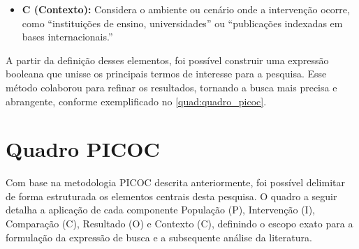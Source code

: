 \begin{itemize}
\begin{itemize}
    \item \textbf{C (Contexto):} Considera o ambiente ou cenário onde a intervenção ocorre, como “instituições de ensino, universidades” ou “publicações indexadas em bases internacionais.”
\end{itemize}
A partir da definição desses elementos, foi possível construir uma expressão booleana que unisse os principais termos de interesse para a pesquisa. Esse método colaborou para refinar os resultados, tornando a busca mais precisa e abrangente, conforme exemplificado no \autoref{quad:quadro_picoc}.
\end{itemize}




\section{Quadro PICOC}
\label{section:quadro_picoc}


Com base na metodologia PICOC descrita anteriormente, foi possível delimitar de forma estruturada os elementos centrais desta pesquisa. O quadro a seguir detalha a aplicação de cada componente  População (P), Intervenção (I), Comparação (C), Resultado (O) e Contexto (C), definindo o escopo exato para a formulação da expressão de busca e a subsequente análise da literatura.

